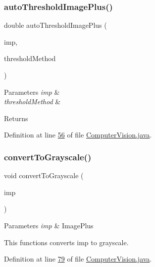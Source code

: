 \subsubsection{\texorpdfstring{auto\+Threshold\+Image\+Plus()}{autoThresholdImagePlus()}\hspace{0.1cm}{\footnotesize\ttfamily [2/2]}}
{\footnotesize\ttfamily double auto\+Threshold\+Image\+Plus (\begin{DoxyParamCaption}\item[{Image\+Plus}]{imp,  }\item[{String}]{threshold\+Method }\end{DoxyParamCaption})}


\begin{DoxyParams}{Parameters}
{\em imp} & \\
\hline
{\em threshold\+Method} & \\
\hline
\end{DoxyParams}
\begin{DoxyReturn}{Returns}

\end{DoxyReturn}


Definition at line \hyperlink{_computer_vision_8java_source_l00056}{56} of file \hyperlink{_computer_vision_8java_source}{Computer\+Vision.\+java}.

\hypertarget{classfunctions_1_1_computer_vision_a4d0fe516e9ef71c60ba67150cf288030}{}\label{classfunctions_1_1_computer_vision_a4d0fe516e9ef71c60ba67150cf288030} 
\subsubsection{\texorpdfstring{convert\+To\+Grayscale()}{convertToGrayscale()}}
{\footnotesize\ttfamily void convert\+To\+Grayscale (\begin{DoxyParamCaption}\item[{Image\+Plus}]{imp }\end{DoxyParamCaption})}


\begin{DoxyParams}{Parameters}
{\em imp} & Image\+Plus\\
\hline
\end{DoxyParams}
This functions converts imp to grayscale. 

Definition at line \hyperlink{_computer_vision_8java_source_l00079}{79} of file \hyperlink{_computer_vision_8java_source}{Computer\+Vision.\+java}.

